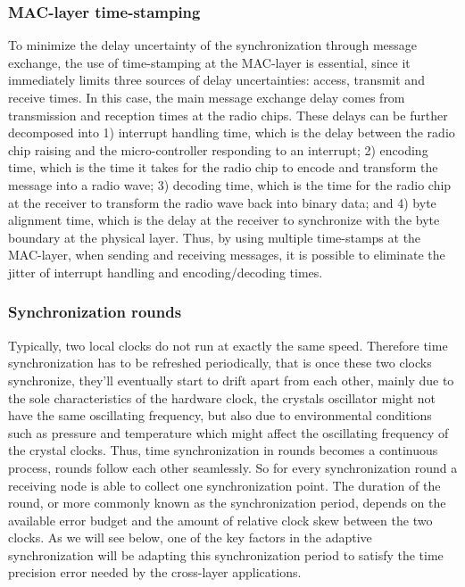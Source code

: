 \subsubsection{MAC-layer time-stamping}
To minimize the delay uncertainty of the synchronization through message exchange, the use of time-stamping at the MAC-layer is essential, since it immediately limits three sources of delay uncertainties: access, transmit and receive times. In this case, the main message exchange delay comes from transmission and reception times at the radio chips. These delays can be further decomposed into 1) interrupt handling time, which is the delay between the radio chip raising and the micro-controller responding to an interrupt; 2) encoding time, which is the time it takes for the radio chip to encode and transform the message into a radio wave; 3) decoding time, which is the time for the radio chip at the receiver to transform the radio wave back into binary data; and 4) byte alignment time, which is the delay at the receiver to synchronize with the byte boundary at the physical layer. Thus, by using multiple time-stamps at the MAC-layer, when sending and receiving messages, it is possible to eliminate the jitter of interrupt handling and encoding/decoding times. 

\subsubsection{Synchronization rounds}
Typically, two local clocks do not run at exactly the same speed. Therefore time synchronization has to be refreshed periodically, that is once these two clocks synchronize, they'll eventually start to drift apart from each other, mainly due to the sole characteristics of the hardware clock, the crystals oscillator might not have the same oscillating frequency, but also due to environmental conditions such as pressure and temperature which might affect the oscillating frequency of the crystal clocks. Thus, time synchronization in rounds becomes a continuous process, rounds follow each other seamlessly. So for every synchronization round a receiving node is able to collect one synchronization point. The duration of the round, or more commonly known as the synchronization period, depends on the available error budget and the amount of relative clock skew between the two clocks. As we will see below, one of the key factors in the adaptive synchronization will be adapting this synchronization period to satisfy the time precision error needed by the cross-layer applications.

